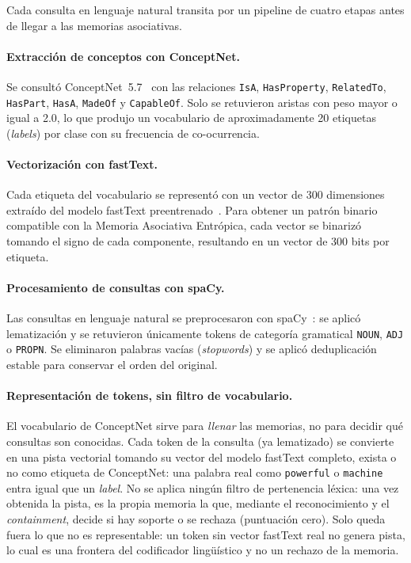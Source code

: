 Cada consulta en lenguaje natural transita por un pipeline de cuatro etapas antes de llegar a las memorias asociativas.

\paragraph{Extracción de conceptos con ConceptNet.}
Se consultó ConceptNet~5.7~\cite{speer2017conceptnet} con las relaciones \texttt{IsA}, \texttt{HasProperty}, \texttt{RelatedTo}, \texttt{HasPart}, \texttt{HasA}, \texttt{MadeOf} y \texttt{CapableOf}.
Solo se retuvieron aristas con peso mayor o igual a 2.0, lo que produjo un vocabulario de aproximadamente 20 etiquetas (\textit{labels}) por clase con su frecuencia de co-ocurrencia.

\paragraph{Vectorización con fastText.}
Cada etiqueta del vocabulario se representó con un vector de 300 dimensiones extraído del modelo fastText preentrenado~\cite{bojanowski2017fasttext}.
Para obtener un patrón binario compatible con la Memoria Asociativa Entrópica, cada vector se binarizó tomando el signo de cada componente, resultando en un vector de 300 bits por etiqueta.

\paragraph{Procesamiento de consultas con spaCy.}
Las consultas en lenguaje natural se preprocesaron con spaCy~\cite{honnibal2020spacy}: se aplicó lematización y se retuvieron únicamente tokens de categoría gramatical \texttt{NOUN}, \texttt{ADJ} o \texttt{PROPN}.
Se eliminaron palabras vacías (\textit{stopwords}) y se aplicó deduplicación estable para conservar el orden del original.

\paragraph{Representación de tokens, sin filtro de vocabulario.}
El vocabulario de ConceptNet sirve para \emph{llenar} las memorias, no para decidir qué consultas son conocidas.
Cada token de la consulta (ya lematizado) se convierte en una pista vectorial tomando su vector del modelo fastText completo, exista o no como etiqueta de ConceptNet: una palabra real como \texttt{powerful} o \texttt{machine} entra igual que un \textit{label}.
No se aplica ningún filtro de pertenencia léxica: una vez obtenida la pista, es la propia memoria la que, mediante el reconocimiento y el \textit{containment}, decide si hay soporte o se rechaza (puntuación cero).
Solo queda fuera lo que no es representable: un token sin vector fastText real no genera pista, lo cual es una frontera del codificador lingüístico y no un rechazo de la memoria.

